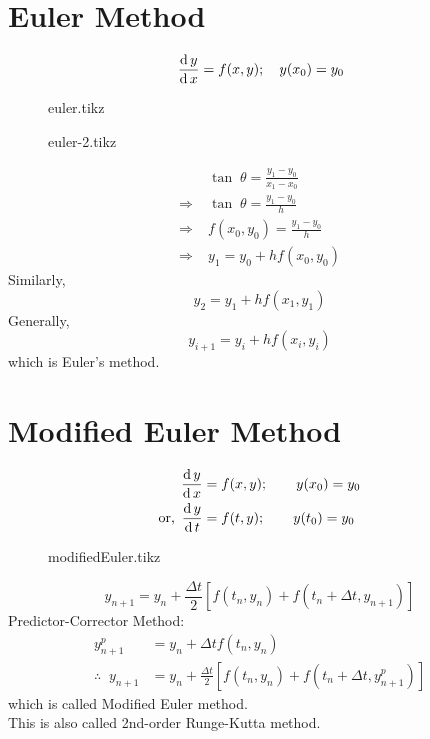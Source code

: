 \documentclass[../main-sheet.tex]{subfiles}
\begin{document}
\section{Euler Method}
\[
    \,\frac{\mathrm{d}\,y}{\mathrm{d}\,x}=f(x,y);\quad y(x_0)=y_0
\]
\begin{figure}[H]
    \centering
    \begin{minipage}[c]{.45\textwidth}
        {euler.tikz}
    \end{minipage}
    \begin{minipage}[c]{.45\textwidth}
        {euler-2.tikz}
    \end{minipage}
\end{figure}
\begin{align*}
    &\tan\;\theta=\frac{y_1-y_0}{x_1-x_0}\\
    \Rightarrow\;&\tan\;\theta=\frac{y_1-y_0}{h}\\
    \Rightarrow\;&f(x_0,y_0)=\frac{y_1-y_0}{h}\\
    \Rightarrow\;&y_1=y_0+hf(x_0,y_0)
\end{align*}
Similarly,
\[y_2=y_1+hf(x_1,y_1)\]
Generally,
\[y_{i+1}=y_i+hf(x_i,y_i)\]
which is Euler's method.
\section{Modified Euler Method}
\begin{align*}
    \,\frac{\mathrm{d}\,y}{\mathrm{d}\,x}&=f(x,y);\qquad y(x_0)=y_0\\
    \text{or, } \,\frac{\mathrm{d}\,y}{\mathrm{d}\,t}&=f(t,y);\qquad y(t_0)=y_0\\
\end{align*}
\begin{figure}[H]
    \centering
    {modifiedEuler.tikz}
\end{figure}
\[
    y_{n+1}=y_n+\frac{\Delta t}{2}\left[ f(t_n,y_n)+f(t_n+\Delta t,y_{n+1})\right]
\]
Predictor-Corrector Method:
\begin{align*}
    y_{n+1}^{p}&=y_n+\Delta t f(t_n,y_n)\\
    \therefore\;\;y_{n+1}&=y_n+\frac{\Delta t}{2}\left[ f(t_n,y_n)+f(t_n+\Delta t,y_{n+1}^p)\right]
\end{align*}
which is called Modified Euler method.\\
This is also called 2nd-order Runge-Kutta method.
\end{document}
